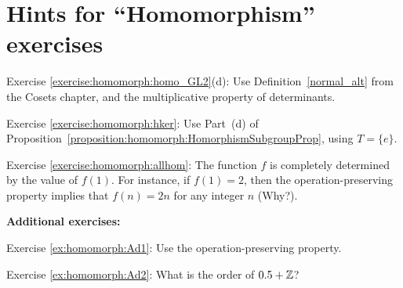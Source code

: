 \section{Hints for ``Homomorphism'' exercises}
\label{sec:Homomorphism:Hints} 


\noindent Exercise \ref{exercise:homomorph:homo_GL2}(d): 
Use Definition~\ref{normal_alt} from the Cosets chapter, and the multiplicative property of determinants.

\noindent Exercise \ref{exercise:homomorph:hker}:   Use Part~(d) of Proposition~\ref{proposition:homomorph:HomorphismSubgroupProp}, using  $T=\{e\}$.

\noindent Exercise \ref{exercise:homomorph:allhom}: 
The function $f$ is completely determined by the value of $f(1)$.  For instance, if $f(1)=2$, then the operation-preserving property implies that $f(n)=2n$ for any integer $n$ (Why?).
\bigskip

\textbf{Additional exercises:}

\noindent Exercise \ref{ex:homomorph:Ad1}:  Use the operation-preserving property.

\noindent Exercise \ref{ex:homomorph:Ad2}: What is the order of $0.5 + \mathbb{Z}$?

